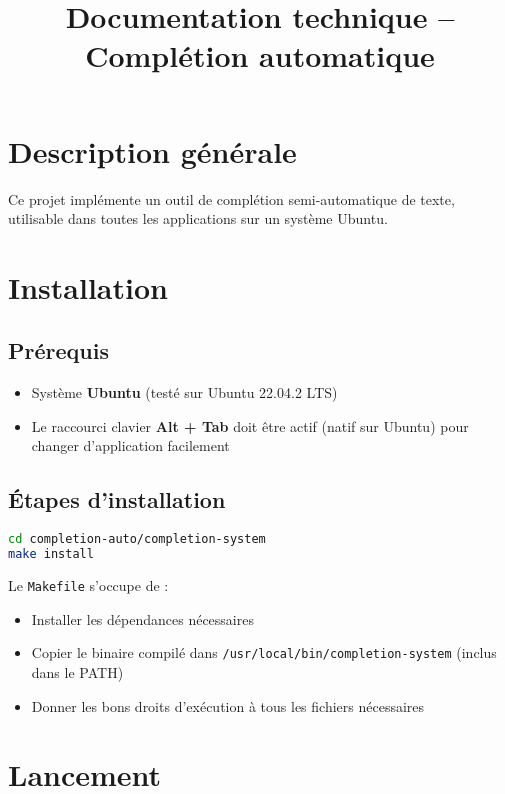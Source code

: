 \documentclass[11pt,a4paper]{article}
\title{Documentation technique -- Complétion automatique}
\author{}
\date{}
\begin{document}
\maketitle

\section*{Description générale}

Ce projet implémente un outil de complétion semi-automatique de texte, utilisable dans toutes les applications sur un système Ubuntu.

\section*{Installation}

\subsection*{Prérequis}

\begin{itemize}
	\item Système \textbf{Ubuntu} (testé sur Ubuntu 22.04.2 LTS)
	\item Le raccourci clavier \textbf{Alt + Tab} doit être actif (natif sur Ubuntu) pour changer d'application facilement
\end{itemize}

\subsection*{Étapes d'installation}

\begin{lstlisting}[language=bash]
cd completion-auto/completion-system
make install
\end{lstlisting}

Le \texttt{Makefile} s’occupe de :
\begin{itemize}
	\item Installer les dépendances nécessaires
	\item Copier le binaire compilé dans \texttt{/usr/local/bin/completion-system} (inclus dans le PATH)
	\item Donner les bons droits d’exécution à tous les fichiers nécessaires
\end{itemize}

\section*{Lancement}
\end{document}
